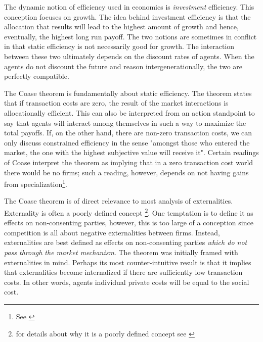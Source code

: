 The dynamic notion of efficiency used in economics is \textit{investment} efficiency. This conception focuses on growth. The idea behind investment efficiency is that the allocation that results will lead to the highest amount of growth and hence, eventually, the highest long run payoff. The two notions are sometimes in conflict in that static efficiency is not necessarily good for growth. The interaction between these two ultimately depends on the discount rates of agents. When the agents do not discount the future and reason intergenerationally, the two are perfectly compatible.

The Coase theorem is fundamentally about static efficiency. The theorem states that if transaction costs are zero, the result of the market interactions is allocationally efficient. This can also be interpreted from an action standpoint to say that agents will interact among themselves in such a way to maximize the total payoffs. If, on the other hand, there are non-zero transaction costs, we can only discuss constrained efficiency in the sense "amongst those who entered the market, the one with the highest subjective value will receive it". Certain readings of Coase interpret the theorem  as implying that in a zero transaction cost world there would be no firms; such a reading, however, depends on not having gains from specialization\footnote{See \cite{demsetz2011rh}}.

The Coase theorem is of direct relevance to most analysis of externalities. Externality is often a poorly defined concept \footnote{for details about why it is a poorly defined concept see \cite{Cheung1970}}. One temptation is to define it as effects on non-consenting parties, however, this is too large of a conception since competition is all about negative externalities between firms. Instead, externalities are best defined as effects on non-consenting parties \textit{which do not pass through the market mechanism}. The theorem was initially framed with externalities in mind. Perhaps its most counter-intuitive result is that it implies that externalities become internalized if there are sufficiently low transaction costs. In other words, agents individual private costs will be equal to the social cost.

